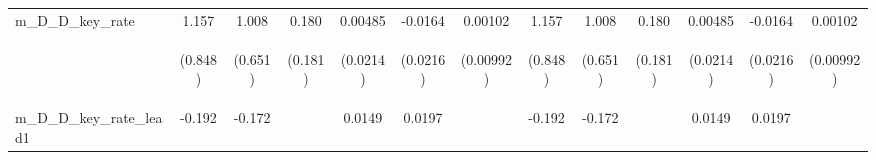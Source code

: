 \documentclass[]{article}
\begin{document}
\begin{center}
\begin{tabular}{lcccccccccccc}
m\_D\_D\_key\_rate & 1.157 & 1.008 & 0.180 & 0.00485 & -0.0164 & 0.00102 & 1.157 & 1.008 & 0.180 & 0.00485 & -0.0164 & 0.00102 \\
\vspace{4pt} & \begin{footnotesize}(0.848)\end{footnotesize} & \begin{footnotesize}(0.651)\end{footnotesize} & \begin{footnotesize}(0.181)\end{footnotesize} & \begin{footnotesize}(0.0214)\end{footnotesize} & \begin{footnotesize}(0.0216)\end{footnotesize} & \begin{footnotesize}(0.00992)\end{footnotesize} & \begin{footnotesize}(0.848)\end{footnotesize} & \begin{footnotesize}(0.651)\end{footnotesize} & \begin{footnotesize}(0.181)\end{footnotesize} & \begin{footnotesize}(0.0214)\end{footnotesize} & \begin{footnotesize}(0.0216)\end{footnotesize} & \begin{footnotesize}(0.00992)\end{footnotesize} \\
m\_D\_D\_key\_rate\_lead1 & -0.192 & -0.172 &  & 0.0149 & 0.0197 &  & -0.192 & -0.172 &  & 0.0149 & 0.0197 &  \\

\end{tabular}
\end{center}
\end{document}
